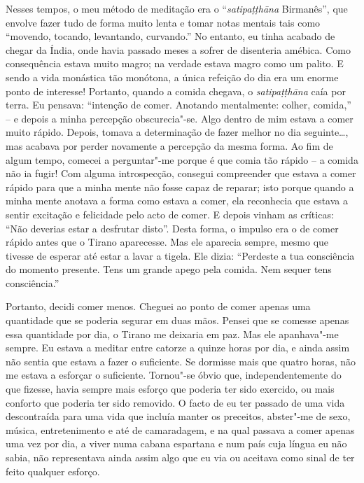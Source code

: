 Nesses tempos, o meu método de meditação era o “\emph{satipaṭṭhāna}
Birmanês”, que envolve fazer tudo de forma muito lenta e tomar notas
mentais tais como “movendo, tocando, levantando, curvando.” No entanto,
eu tinha acabado de chegar da Índia, onde havia passado meses a sofrer
de disenteria amébica. Como consequência estava muito magro; na verdade
estava magro como um palito. E sendo a vida monástica tão monótona, a
única refeição do dia era um enorme ponto de interesse! Portanto, quando
a comida chegava, o \emph{satipaṭṭhāna} caía por terra. Eu pensava:
“intenção de comer. Anotando mentalmente: colher, comida,” -- e depois a
minha percepção obscurecia"-se. Algo dentro de mim estava a comer muito
rápido. Depois, tomava a determinação de fazer melhor no dia
seguinte\ldots{}, mas acabava por perder novamente a percepção da mesma
forma. Ao fim de algum tempo, comecei a perguntar"-me porque é que comia
tão rápido -- a comida não ia fugir! Com alguma introspecção, consegui
compreender que estava a comer rápido para que a minha mente não fosse
capaz de reparar; isto porque quando a minha mente anotava a forma como
estava a comer, ela reconhecia que estava a sentir excitação e
felicidade pelo acto de comer. E depois vinham as críticas: “Não
deverias estar a desfrutar disto”. Desta forma, o impulso era o de comer
rápido antes que o Tirano aparecesse. Mas ele aparecia sempre, mesmo que
tivesse de esperar até estar a lavar a tigela. Ele dizia: “Perdeste a
tua consciência do momento presente. Tens um grande apego pela comida.
Nem sequer tens consciência.”

Portanto, decidi comer menos. Cheguei ao ponto de comer apenas uma
quantidade que se poderia segurar em duas mãos. Pensei que se comesse
apenas essa quantidade por dia, o Tirano me deixaria em paz. Mas ele
apanhava"-me sempre. Eu estava a meditar entre catorze a quinze horas por
dia, e ainda assim não sentia que estava a fazer o suficiente. Se
dormisse mais que quatro horas, não me estava a esforçar o suficiente.
Tornou"-se óbvio que, independentemente do que fizesse, havia sempre mais
esforço que poderia ter sido exercido, ou mais conforto que poderia ter
sido removido. O facto de eu ter passado de uma vida descontraída para
uma vida que incluía manter os preceitos, abster"-me de sexo, música,
entretenimento e até de camaradagem, e na qual passava a comer apenas
uma vez por dia, a viver numa cabana espartana e num país cuja língua eu
não sabia, não representava ainda assim algo que eu via ou aceitava como
sinal de ter feito qualquer esforço.

